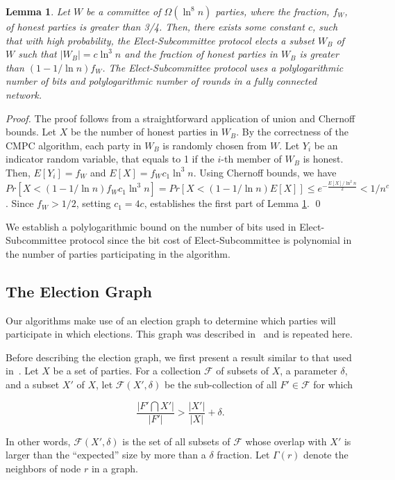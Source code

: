 \documentclass[11pt,letter]{article}
\theoremstyle{mytheoremstyle}
\newtheorem{lemma}{Lemma}
\newcommand{\hw}{\mbox{\textsf{CMPC}}\xspace}
\newcommand{\es}{\mbox{\textsf{Elect-Subcommittee}}\xspace}
\begin{document}
\begin{lemma}\label{lem:subcommittee}
	Let $W$ be a committee of $\Omega(\ln^8{n})$ parties, where the fraction, $f_W$, of honest parties is greater than 3/4. Then, there exists some constant $c$, such that with high probability, the \es protocol elects a subset $W_B$ of $W$ such that $|W_B| = c \ln^3{n}$ and the fraction of honest parties in $W_B$ is greater than $(1-1/ \ln{n})f_W$. The \es protocol uses a polylogarithmic number of bits and polylogarithmic number of rounds in a fully connected network.
\end{lemma}
\begin{proof}
	The proof follows from a straightforward application of union and Chernoff bounds. Let $X$ be the number of honest parties in $W_B$. By the correctness of the \hw algorithm, each party in $W_B$ is randomly chosen from $W$. Let $Y_i$ be an indicator random variable, that equals to 1 if the $i$-th member of $W_B$ is honest. Then, $E[Y_i] = f_W$ and $E[X] = f_Wc_1\ln^3{n}$. Using Chernoff bounds, we have $Pr[X < (1-1/\ln{n})f_Wc_1\ln^3{n}] = Pr[X < (1-1/\ln{n})E[X]] \leq e^{-\frac{E[X]/\ln^2{n}}{2}} < 1/n^c$. Since $f_W>1/2$, setting $c_1 = 4c$, establishes the first part of Lemma \ref{lem:subcommittee}.
	\qed
\end{proof}

We establish a polylogarithmic bound on the number of bits used in \es protocol since the bit cost of \es is polynomial in the number of parties participating in the algorithm.

\subsection{The Election Graph} \label{s:layered network}

Our algorithms make use of an election graph to determine which parties will participate in which elections. This graph was described in~\cite{KSSV,King:2006:TSS:1170136.1170491} and is repeated here.

Before describing the election graph, we first present a result similar to that used in~\cite{Cooper}. Let $X$ be a set of parties. For a collection $\mathcal{F}$ of subsets of $X$, a parameter $\delta$, and a subset $X'$ of $X$, let $\mathcal{F}(X', \delta)$ be the sub-collection of all $F' \in \mathcal{F}$ for which

\[\frac{|F' \bigcap X'|}{|F'|} > \frac{|X'|}{|X|} + \delta.\]

In other words, $\mathcal{F}(X', \delta)$ is the set of all subsets of $\mathcal{F}$ whose overlap with  $X'$ is larger than the ``expected'' size by more than a $\delta$ fraction.
Let $\Gamma(r)$ denote the neighbors of node $r$ in a graph.
\end{document}
